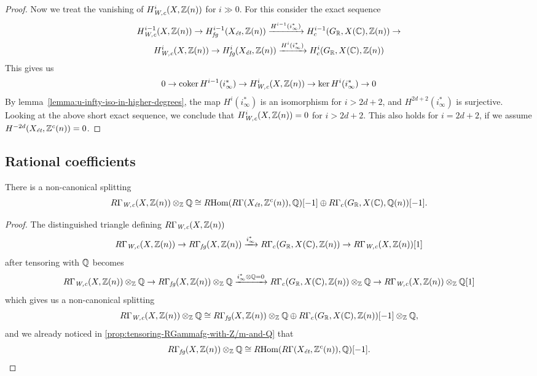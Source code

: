 \documentclass{article}
\numberwithin{equation}{section}
\begin{document}
\begin{proposition}
\begin{proof}
    \vspace{1em}

    Now we treat the vanishing of $H^i_\Wc (X, \ZZ(n))$ for $i \gg 0$.
    For this consider the exact sequence
    \begin{multline*}
      H^{i-1}_\Wc (X, \ZZ(n)) \to
      H^{i-1}_\fg (X_\et, \ZZ(n)) \xrightarrow{H^{i-1} (i_\infty^*)}
      H^{i-1}_c (G_\RR, X (\CC), \ZZ(n)) \to \\
      H^i_\Wc (X, \ZZ(n)) \to
      H^i_\fg (X_\et, \ZZ(n)) \xrightarrow{H^i (i_\infty^*)}
      H^i_c (G_\RR, X (\CC), \ZZ(n))
    \end{multline*}
    This gives us
    \[ 0 \to \coker H^{i-1} (i_\infty^*) \to
      H^i_\Wc (X, \ZZ(n)) \to
      \ker H^i (i_\infty^*) \to 0 \]
    By lemma~\ref{lemma:u-infty-iso-in-higher-degrees}, the map
    $H^i (i_\infty^*)$ is an isomorphism for $i > 2d+2$, and
    $H^{2d+2} (i_\infty^*)$ is surjective. Looking at the above short exact
    sequence, we conclude that $H^i_\Wc (X, \ZZ(n)) = 0$ for $i > 2d + 2$. This
    also holds for $i = 2d + 2$, if we assume $H^{-2d} (X_\et, \ZZ^c(n)) = 0$.
  \end{proof}
\end{proposition}

\subsection*{Rational coefficients}

\begin{proposition}
  There is a non-canonical splitting
  \[ R\Gamma_\Wc (X, \ZZ(n)) \otimes_\ZZ \QQ \cong
    \RHom (R\Gamma (X_\et, \ZZ^c (n)), \QQ) [-1] \oplus
    R\Gamma_c (G_\RR, X (\CC), \QQ (n)) [-1]. \]

  \begin{proof}
    The distinguished triangle defining $R\Gamma_\Wc (X, \ZZ(n))$
    \[ R\Gamma_\Wc (X, \ZZ (n)) \to
      R\Gamma_\fg (X, \ZZ(n)) \xrightarrow{i_\infty^*}
      R\Gamma_c (G_\RR, X (\CC), \ZZ(n)) \to
      R\Gamma_\Wc (X, \ZZ (n)) [1] \]
    after tensoring with $\QQ$ becomes
    \[ R\Gamma_\Wc (X, \ZZ (n))\otimes_\ZZ \QQ \to
      R\Gamma_\fg (X, \ZZ(n))\otimes_\ZZ \QQ \xrightarrow{i_\infty^*\otimes\QQ = 0}
      R\Gamma_c (G_\RR, X (\CC), \ZZ(n))\otimes_\ZZ \QQ \to
      R\Gamma_\Wc (X, \ZZ (n))\otimes_\ZZ \QQ [1] \]
    which gives us a non-canonical splitting
    \cite[Chapitre~II, Corollaire~1.2.6]{Verdier-thesis}
    \[ R\Gamma_\Wc (X, \ZZ (n))\otimes_\ZZ \QQ \cong
      R\Gamma_\fg (X, \ZZ(n))\otimes_\ZZ \QQ \oplus
      R\Gamma_c (G_\RR, X (\CC), \ZZ(n)) [-1]\otimes_\ZZ \QQ, \]
    and we already noticed in \ref{prop:tensoring-RGammafg-with-Z/m-and-Q} that
    \[ R\Gamma_\fg (X, \ZZ (n)) \otimes_\ZZ \QQ \cong
      \RHom (R\Gamma (X_\et, \ZZ^c (n)), \QQ) [-1]. \qedhere \]
  \end{proof}
\end{proposition}
\end{document}
